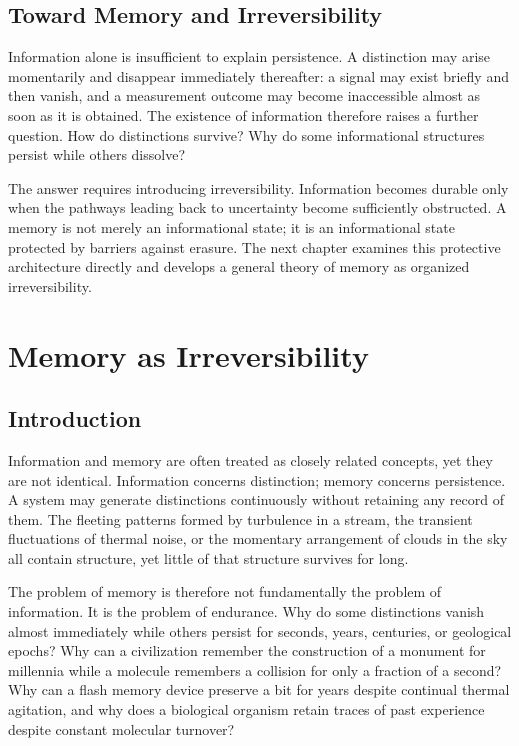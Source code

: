 \documentclass[11pt,oneside]{book}
\theoremstyle{plain}
\theoremstyle{definition}
\theoremstyle{remark}
\begin{document}
\section{Toward Memory and Irreversibility}

Information alone is insufficient to explain persistence. A distinction may arise momentarily and disappear immediately thereafter: a signal may exist briefly and then vanish, and a measurement outcome may become inaccessible almost as soon as it is obtained. The existence of information therefore raises a further question. How do distinctions survive? Why do some informational structures persist while others dissolve?

The answer requires introducing irreversibility. Information becomes durable only when the pathways leading back to uncertainty become sufficiently obstructed. A memory is not merely an informational state; it is an informational state protected by barriers against erasure. The next chapter examines this protective architecture directly and develops a general theory of memory as organized irreversibility.

\chapter{Memory as Irreversibility}

\section{Introduction}

Information and memory are often treated as closely related concepts, yet they are not identical. Information concerns distinction; memory concerns persistence. A system may generate distinctions continuously without retaining any record of them. The fleeting patterns formed by turbulence in a stream, the transient fluctuations of thermal noise, or the momentary arrangement of clouds in the sky all contain structure, yet little of that structure survives for long.

The problem of memory is therefore not fundamentally the problem of information. It is the problem of endurance. Why do some distinctions vanish almost immediately while others persist for seconds, years, centuries, or geological epochs? Why can a civilization remember the construction of a monument for millennia while a molecule remembers a collision for only a fraction of a second? Why can a flash memory device preserve a bit for years despite continual thermal agitation, and why does a biological organism retain traces of past experience despite constant molecular turnover?
\end{document}

